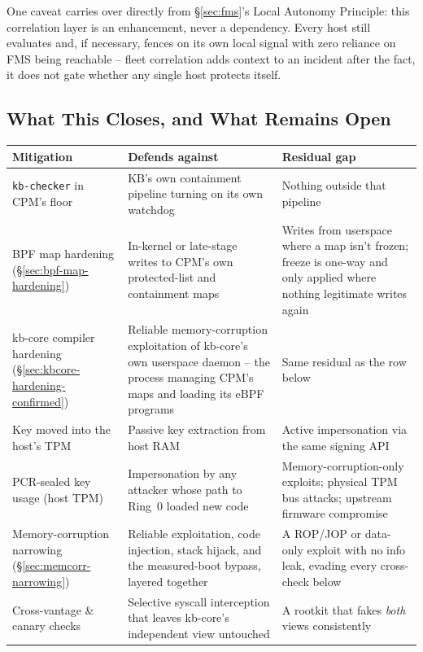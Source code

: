 \documentclass[11pt,a4paper]{article}
\begin{document}
One caveat carries over directly from \S\ref{sec:fms}'s Local Autonomy
Principle: this correlation layer is an enhancement, never a
dependency. Every host still evaluates and, if necessary, fences on
its own local signal with zero reliance on FMS being reachable --
fleet correlation adds context to an incident after the fact, it does
not gate whether any single host protects itself.

\subsection{What This Closes, and What Remains Open}

\begin{center}
\renewcommand{\arraystretch}{1.5}
\small
\begin{tabular}{@{}p{3.3cm}p{5.6cm}p{4.1cm}@{}}
\toprule
\textbf{Mitigation} & \textbf{Defends against} & \textbf{Residual gap} \\
\midrule
\texttt{kb-checker} in CPM's floor & KB's own containment pipeline
turning on its own watchdog & Nothing outside that pipeline \\
BPF map hardening (\S\ref{sec:bpf-map-hardening}) & In-kernel or
late-stage writes to CPM's own protected-list and containment maps &
Writes from userspace where a map isn't frozen; freeze is one-way and
only applied where nothing legitimate writes again \\
kb-core compiler hardening (\S\ref{sec:kbcore-hardening-confirmed}) &
Reliable memory-corruption exploitation of kb-core's own userspace
daemon -- the process managing CPM's maps and loading its eBPF
programs & Same residual as the row below \\
Key moved into the host's TPM & Passive key extraction from host RAM &
Active impersonation via the same signing API \\
PCR-sealed key usage (host TPM) & Impersonation by any attacker whose path to
Ring~0 loaded new code & Memory-corruption-only exploits; physical TPM
bus attacks; upstream firmware compromise \\
Memory-corruption narrowing (\S\ref{sec:memcorr-narrowing}) & Reliable
exploitation, code injection, stack hijack, and the measured-boot
bypass, layered together & A ROP/JOP or data-only exploit with no info
leak, evading every cross-check below \\
Cross-vantage \& canary checks & Selective syscall interception that
leaves kb-core's independent view untouched & A rootkit that fakes
\emph{both} views consistently \\

\end{tabular}
\end{center}
\end{document}
